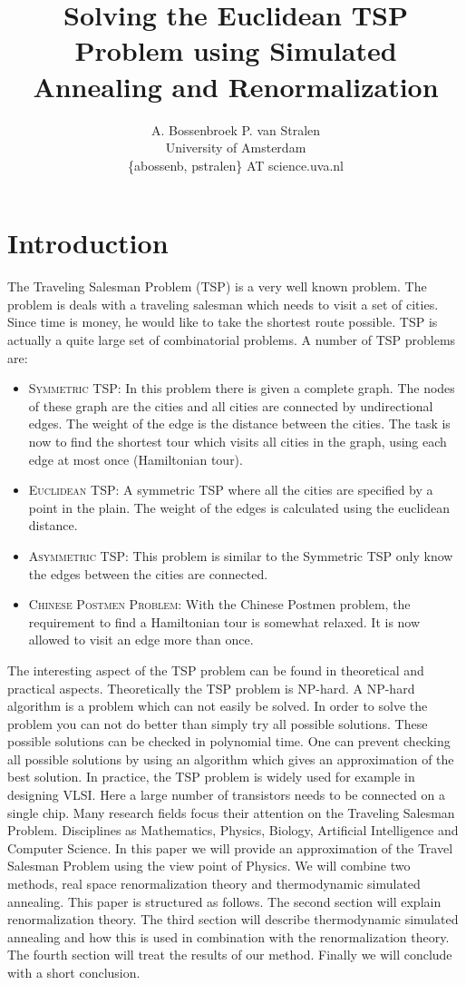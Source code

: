 \documentclass[twocolumn]{article}
\author{A. Bossenbroek P. van Stralen\\University of Amsterdam\\\{abossenb, pstralen\} AT science.uva.nl}
\title{Solving the Euclidean TSP Problem using Simulated Annealing and Renormalization }
\begin{document}
\maketitle
\section{Introduction}
The Traveling Salesman Problem (TSP) is a very well known problem. The problem is deals with a traveling salesman which needs to visit a set of cities. Since time is money, he would like to take the shortest route possible. TSP is actually a quite large set of combinatorial problems. A number of TSP problems are:
\begin{itemize}
\item \textsc{Symmetric TSP:}  In this problem there is given a complete graph. The nodes of these graph are the cities and all cities are connected by undirectional edges. The weight of the edge is the distance between the cities. The task is now to find the shortest tour which visits all cities in the graph, using each edge at most once (Hamiltonian tour).
\item \textsc{Euclidean TSP:}  A symmetric TSP where all the cities are specified by a point in the plain. The weight of the edges is calculated using the euclidean distance.
\item \textsc{Asymmetric TSP:} This problem is similar to the Symmetric TSP only know the edges between the cities are connected.
\item \textsc{Chinese Postmen Problem:} With the Chinese Postmen problem,  the requirement to find a Hamiltonian tour is somewhat relaxed. It is now allowed to visit an edge more than once.
\end{itemize}
The interesting aspect of the TSP problem can be found in theoretical and practical aspects. Theoretically the TSP problem is NP-hard. A NP-hard algorithm is a problem which can not easily be solved. In order to solve the problem you can not do better than simply try all possible solutions. These possible solutions can be checked in polynomial time.  One can prevent checking all possible solutions by using an algorithm which gives an approximation of the best solution.
In practice, the TSP problem is widely used for example in designing  VLSI. Here a large number of transistors needs to be connected on a single chip.
\newline\newline\noindent
Many research fields focus their attention on the Traveling Salesman Problem. Disciplines as Mathematics, Physics, Biology, Artificial Intelligence and Computer Science. In this paper we will provide an approximation of the Travel Salesman Problem using the view point of Physics. We will combine two methods, real space renormalization theory and thermodynamic simulated annealing. This paper is structured as follows. The second section will explain renormalization theory. The third section will describe thermodynamic simulated annealing and how this is used in combination with the renormalization theory. The fourth section will treat the results of our method. Finally we will conclude with a short conclusion.
\end{document}
